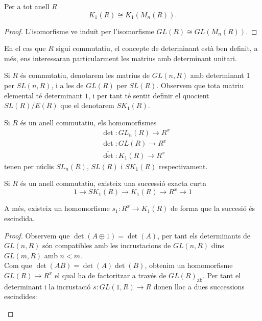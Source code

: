\begin{prop} Per a tot anell $R$
$$
K_1(R)\cong K_1(M_n(R)).
$$
\end{prop}
\begin{proof}
L'isomorfisme ve induït per l'isomorfisme $GL(R)\cong GL(M_n(R))$.
\end{proof}
 
En el cas que $R$ sigui commutatiu, el concepte de determinant està ben definit, a més, ens interessaran particularment les matrius amb determinant unitari.

\begin{definition} Si $R$ és commutatiu, denotarem les matrius de $GL(n,R)$ amb determinant 1 per $SL(n,R)$, i a les de $GL(R)$ per $SL(R)$. Observem que tota matriu elemental té determinant $1$, i per tant té sentit definir el quocient $SL(R)/E(R)$ que el denotarem $SK_1(R)$. 
\end{definition}

\begin{obs}
Si $R$ és un anell commutatiu, els homomorfismes
\begin{eqnarray*}
&\det: GL_n(R) \rightarrow R^x \\
&\det: GL(R) \rightarrow R^x \\
&\overline{\det}: K_1(R) \rightarrow R^x 
\end{eqnarray*}
tenen per núclis $SL_n(R)$, $SL(R)$ i $SK_1(R)$ respectivament.
\end{obs}


\begin{prop}
Si $R$ és un anell commutatiu, existeix una successió exacta curta
$$
1 \rightarrow SK_1(R) \rightarrow K_1(R) \rightarrow R^x \rightarrow 1 
$$

A més, existeix un homomorfisme $s_1: R^x \rightarrow K_1(R)$ de forma que la succesió és escindida.

\end{prop}

\begin{proof}
Observem que $\det(A\oplus 1) = \det(A)$, per tant els determinants de $GL(n,R)$ són compatibles amb les incrustacions de $GL(n,R)$ dins $GL(m,R)$ amb $n<m$. \\
\indent Com que $\det(AB) = \det(A)\det(B)$, obtenim un homomorfisme $GL(R)\rightarrow R^x$ el qual ha de factoritzar a través de $GL(R)_\text{ab}$. Per tant el determinant i la incrustació $s:GL(1,R)\rightarrow R$ donen lloc a dues successions escindides: 
\begin{center}
\end{center}
\end{proof}


